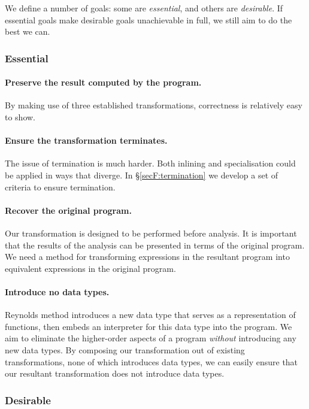 We define a number of goals: some are \textit{essential}, and others are \textit{desirable}. If essential goals make desirable goals unachievable in full, we still aim to do the best we can.

\subsubsection*{Essential}

\paragraph{Preserve the result computed by the program.} By making use of three established transformations, correctness is relatively easy to show.

\paragraph{Ensure the transformation terminates.} The issue of termination is much harder. Both inlining and specialisation could be applied in ways that diverge. In \S\ref{secF:termination} we develop a set of criteria to ensure termination.

\paragraph{Recover the original program.} Our transformation is designed to be performed before analysis. It is important that the results of the analysis can be presented in terms of the original program. We need a method for transforming expressions in the resultant program into equivalent expressions in the original program.

\paragraph{Introduce no data types.} Reynolds method introduces a new data type that serves as a representation of functions, then embeds an interpreter for this data type into the program. We aim to eliminate the higher-order aspects of a program \textit{without} introducing any new data types. By composing our transformation out of existing transformations, none of which introduces data types, we can easily ensure that our resultant transformation does not introduce data types.


\subsubsection*{Desirable}

